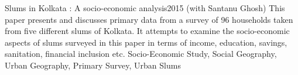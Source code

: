 %
%
%



\begin{projects}
	\project
	{Slums in Kolkata : A socio-economic analysis}{2015}
	{ (with Santanu Ghosh)}
	{This paper presents and discusses primary data from a survey of 96 households taken from five different slums of Kolkata. It attempts to examine the socio-economic aspects of slums surveyed in this paper in terms of income, education, savings, sanitation, financial inclusion etc.}
	{Socio-Economic Study, Social Geography, Urban Geography, Primary Survey, Urban Slums}
\end{projects}